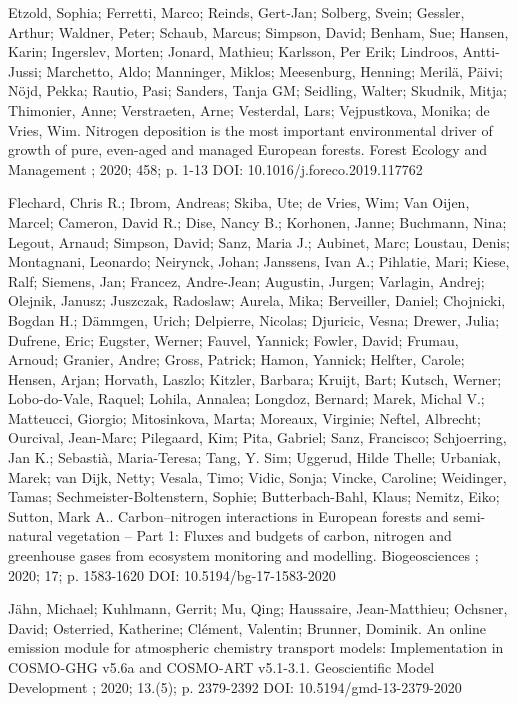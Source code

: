 \begin{list}{}{\setlength{\leftmargin}{15pt}\setlength{\itemindent}{-\leftmargin}}
\item[]
Etzold, Sophia; Ferretti, Marco; Reinds, Gert-Jan; Solberg, Svein; Gessler, Arthur; Waldner, Peter; Schaub, Marcus; Simpson, David; Benham, Sue; Hansen, Karin; Ingerslev, Morten; Jonard, Mathieu; Karlsson, Per Erik; Lindroos, Antti-Jussi; Marchetto, Aldo; Manninger, Miklos; Meesenburg, Henning; Merilä, Päivi; Nöjd, Pekka; Rautio, Pasi; Sanders, Tanja GM; Seidling, Walter; Skudnik, Mitja; Thimonier, Anne; Verstraeten, Arne; Vesterdal, Lars; Vejpustkova, Monika; de Vries, Wim.
Nitrogen deposition is the most important environmental driver of growth of pure, even-aged and managed European forests.
Forest Ecology and Management ; 2020; 458; p. 1-13
DOI: 10.1016/j.foreco.2019.117762

\item[]
Flechard, Chris R.; Ibrom, Andreas; Skiba, Ute; de Vries, Wim; Van Oijen, Marcel; Cameron, David R.; Dise, Nancy B.; Korhonen, Janne; Buchmann, Nina; Legout, Arnaud; Simpson, David; Sanz, Maria J.; Aubinet, Marc; Loustau, Denis; Montagnani, Leonardo; Neirynck, Johan; Janssens, Ivan A.; Pihlatie, Mari; Kiese, Ralf; Siemens, Jan; Francez, Andre-Jean; Augustin, Jurgen; Varlagin, Andrej; Olejnik, Janusz; Juszczak, Radoslaw; Aurela, Mika; Berveiller, Daniel; Chojnicki, Bogdan H.; Dämmgen, Urich; Delpierre, Nicolas; Djuricic, Vesna; Drewer, Julia; Dufrene, Eric; Eugster, Werner; Fauvel, Yannick; Fowler, David; Frumau, Arnoud; Granier, Andre; Gross, Patrick; Hamon, Yannick; Helfter, Carole; Hensen, Arjan; Horvath, Laszlo; Kitzler, Barbara; Kruijt, Bart; Kutsch, Werner; Lobo-do-Vale, Raquel; Lohila, Annalea; Longdoz, Bernard; Marek, Michal V.; Matteucci, Giorgio; Mitosinkova, Marta; Moreaux, Virginie; Neftel, Albrecht; Ourcival, Jean-Marc; Pilegaard, Kim; Pita, Gabriel; Sanz, Francisco; Schjoerring, Jan K.; Sebastià, Maria-Teresa; Tang, Y. Sim; Uggerud, Hilde Thelle; Urbaniak, Marek; van Dijk, Netty; Vesala, Timo; Vidic, Sonja; Vincke, Caroline; Weidinger, Tamas; Sechmeister-Boltenstern, Sophie; Butterbach-Bahl, Klaus; Nemitz, Eiko; Sutton, Mark A..
Carbon–nitrogen interactions in European forests and semi-natural vegetation – Part 1: Fluxes and budgets of carbon, nitrogen and greenhouse gases from ecosystem monitoring and modelling.
Biogeosciences ; 2020; 17; p. 1583-1620
DOI: 10.5194/bg-17-1583-2020

\item[]
Jähn, Michael; Kuhlmann, Gerrit; Mu, Qing; Haussaire, Jean-Matthieu; Ochsner, David; Osterried, Katherine; Clément, Valentin; Brunner, Dominik.
An online emission module for atmospheric chemistry transport models: Implementation in COSMO-GHG v5.6a and COSMO-ART v5.1-3.1.
Geoscientific Model Development ; 2020; 13.(5); p. 2379-2392
DOI: 10.5194/gmd-13-2379-2020


\end{list}
